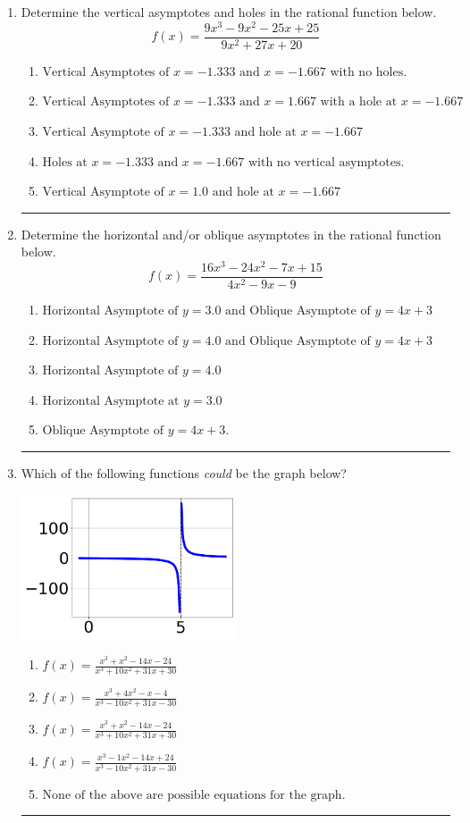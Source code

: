 \documentclass[14pt]{extbook}
\newcommand{\litem}[1]{\item#1\hspace*{-1cm}\rule{\textwidth}{0.4pt}}
\begin{document}
\begin{enumerate}
\litem{
Determine the vertical asymptotes and holes in the rational function below.\[ f(x) = \frac{9x^{3} -9 x^{2} -25 x + 25}{9x^{2} +27 x + 20} \]\begin{enumerate}[label=\Alph*.]
\item \( \text{Vertical Asymptotes of } x = -1.333 \text{ and } x = -1.667 \text{ with no holes.} \)
\item \( \text{Vertical Asymptotes of } x = -1.333 \text{ and } x = 1.667 \text{ with a hole at } x = -1.667 \)
\item \( \text{Vertical Asymptote of } x = -1.333 \text{ and hole at } x = -1.667 \)
\item \( \text{Holes at } x = -1.333 \text{ and } x = -1.667 \text{ with no vertical asymptotes.} \)
\item \( \text{Vertical Asymptote of } x = 1.0 \text{ and hole at } x = -1.667 \)

\end{enumerate} }
\litem{
Determine the horizontal and/or oblique asymptotes in the rational function below.\[ f(x) = \frac{16x^{3} -24 x^{2} -7 x + 15}{4x^{2} -9 x -9} \]\begin{enumerate}[label=\Alph*.]
\item \( \text{Horizontal Asymptote of } y = 3.0 \text{ and Oblique Asymptote of } y = 4x + 3 \)
\item \( \text{Horizontal Asymptote of } y = 4.0 \text{ and Oblique Asymptote of } y = 4x + 3 \)
\item \( \text{Horizontal Asymptote of } y = 4.0  \)
\item \( \text{Horizontal Asymptote at } y = 3.0 \)
\item \( \text{Oblique Asymptote of } y = 4x + 3. \)

\end{enumerate} }
\litem{
Which of the following functions \textit{could} be the graph below?
\begin{center}
    \includegraphics[width=0.5\textwidth]{../Figures/identifyGraphOfRationalFunctionC.png}
\end{center}
\begin{enumerate}[label=\Alph*.]
\item \( f(x)=\frac{x^{3} + x^{2} -14 x -24}{x^{3} +10 x^{2} +31 x + 30} \)
\item \( f(x)=\frac{x^{3} +4 x^{2} -x -4}{x^{3} -10 x^{2} +31 x -30} \)
\item \( f(x)=\frac{x^{3} + x^{2} -14 x -24}{x^{3} +10 x^{2} +31 x + 30} \)
\item \( f(x)=\frac{x^{3} -1 x^{2} -14 x + 24}{x^{3} -10 x^{2} +31 x -30} \)
\item \( \text{None of the above are possible equations for the graph.} \)


\end{enumerate}}
\end{enumerate}
\end{document}
